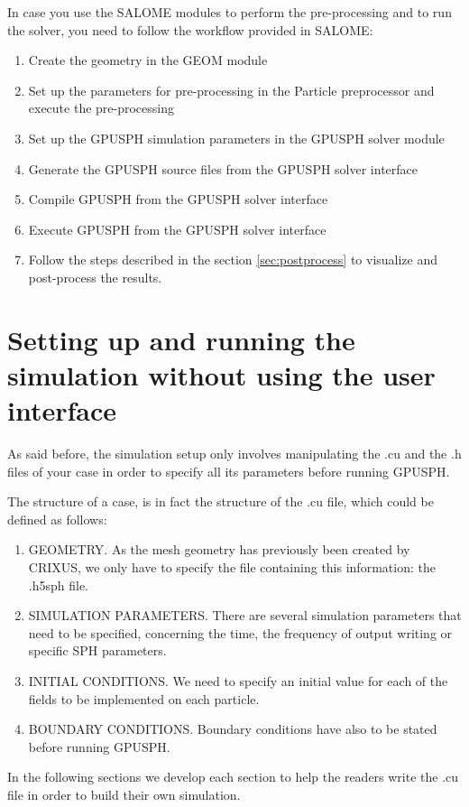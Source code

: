 \documentclass{../GPUSPHtemplate}
\begin{document}
In case you use the SALOME modules to perform the pre-processing and to run
the solver, you need to follow the workflow provided in SALOME:
\begin{enumerate}
\item Create the geometry in the GEOM module
\item Set up the parameters for pre-processing in the Particle preprocessor and execute the pre-processing
\item Set up the GPUSPH simulation parameters in the GPUSPH solver module
\item Generate the GPUSPH source files from the GPUSPH solver interface
\item Compile GPUSPH from the GPUSPH solver interface
\item Execute GPUSPH from the GPUSPH solver interface
\item Follow the steps described in the section \ref{sec:postprocess} 
  to visualize and post-process the results.
\end{enumerate}



\section{Setting up and running the simulation without using the user interface}

As said before, the simulation setup only involves manipulating the .cu and the .h 
files of your case in order to specify all its parameters before running GPUSPH. 

The structure of a case, is in fact the structure of the .cu file, 
which could be defined as follows:
\begin{enumerate}
\item GEOMETRY. As the mesh geometry has previously been 
created by CRIXUS, we only have to specify the file 
containing this information: the .h5sph file.
\item SIMULATION PARAMETERS. There are several simulation 
parameters that need to be specified, concerning the time, 
the frequency of output writing or specific SPH parameters.
\item INITIAL CONDITIONS. We need to specify an initial 
value for each of the fields to be implemented on each particle.
\item BOUNDARY CONDITIONS. Boundary conditions 
have also to be stated before running GPUSPH.
\end{enumerate}
In the following sections we develop each section to help 
the readers write the .cu file in order to build their own simulation.
\end{document}
